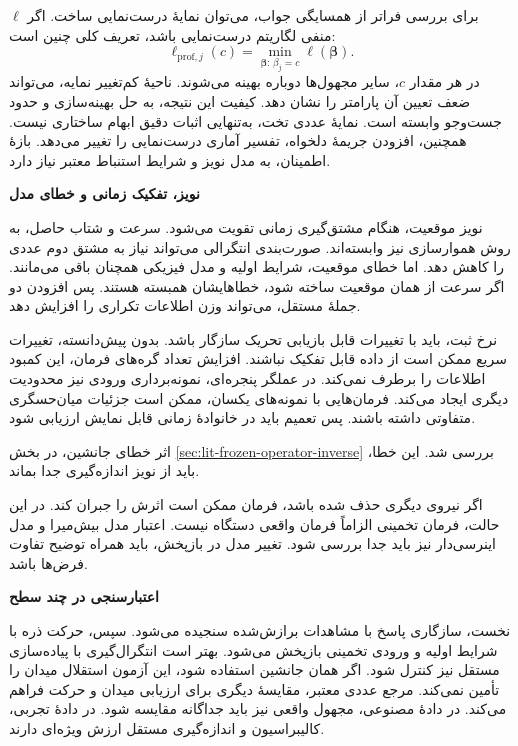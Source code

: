 برای بررسی فراتر از همسایگی جواب، می‌توان نمایهٔ درست‌نمایی ساخت.
اگر $\ell$ منفی لگاریتم درست‌نمایی باشد، تعریف کلی چنین است:
\begin{equation}
\ell_{\mathrm{prof},j}(c)
=\min_{\boldsymbol\beta:\,\beta_j=c}
\ell(\boldsymbol\beta).
\label{eq:lit-identifiability-profile}
\end{equation}
در هر مقدار $c$، سایر مجهول‌ها دوباره بهینه می‌شوند.
ناحیهٔ کم‌تغییر نمایه، می‌تواند ضعف تعیین آن پارامتر را نشان دهد.
کیفیت این نتیجه، به حل بهینه‌سازی و حدود جست‌وجو وابسته است.
نمایهٔ عددی تخت، به‌تنهایی اثبات دقیق ابهام ساختاری نیست.
همچنین، افزودن جریمهٔ دلخواه، تفسیر آماری درست‌نمایی را تغییر می‌دهد.
بازهٔ اطمینان، به مدل نویز و شرایط استنباط معتبر نیاز دارد.

\textbf{نویز، تفکیک زمانی و خطای مدل}

نویز موقعیت، هنگام مشتق‌گیری زمانی تقویت می‌شود.
سرعت و شتاب حاصل، به روش هموارسازی نیز وابسته‌اند.
صورت‌بندی انتگرالی می‌تواند نیاز به مشتق دوم عددی را کاهش دهد.
اما خطای موقعیت، شرایط اولیه و مدل فیزیکی همچنان باقی می‌مانند.
اگر سرعت از همان موقعیت ساخته شود، خطاهایشان همبسته هستند.
پس افزودن دو جملهٔ مستقل، می‌تواند وزن اطلاعات تکراری را افزایش دهد.

نرخ ثبت، باید با تغییرات قابل بازیابی تحریک سازگار باشد.
بدون پیش‌دانسته، تغییرات سریع ممکن است از داده قابل تفکیک نباشند.
افزایش تعداد گره‌های فرمان، این کمبود اطلاعات را برطرف نمی‌کند.
در عملگر پنجره‌ای، نمونه‌برداری ورودی نیز محدودیت دیگری ایجاد می‌کند.
فرمان‌هایی با نمونه‌های یکسان، ممکن است جزئیات میان‌حسگری متفاوتی داشته باشند.
پس تعمیم باید در خانوادهٔ زمانی قابل نمایش ارزیابی شود.

اثر خطای جانشین، در بخش \ref{sec:lit-frozen-operator-inverse} بررسی شد.
این خطا، باید از نویز اندازه‌گیری جدا بماند.
\cite{Cao2023ResidualCorrection}

اگر نیروی دیگری حذف شده باشد، فرمان ممکن است اثرش را جبران کند.
در این حالت، فرمان تخمینی الزاماً فرمان واقعی دستگاه نیست.
اعتبار مدل بیش‌میرا و مدل اینرسی‌دار نیز باید جدا بررسی شود.
تغییر مدل در بازپخش، باید همراه توضیح تفاوت فرض‌ها باشد.

\textbf{اعتبارسنجی در چند سطح}

نخست، سازگاری پاسخ با مشاهدات برازش‌شده سنجیده می‌شود.
سپس، حرکت ذره با شرایط اولیه و ورودی تخمینی بازپخش می‌شود.
بهتر است انتگرال‌گیری با پیاده‌سازی مستقل نیز کنترل شود.
اگر همان جانشین استفاده شود، این آزمون استقلال میدان را تأمین نمی‌کند.
مرجع عددی معتبر، مقایسهٔ دیگری برای ارزیابی میدان و حرکت فراهم می‌کند.
در دادهٔ مصنوعی، مجهول واقعی نیز باید جداگانه مقایسه شود.
در دادهٔ تجربی، کالیبراسیون و اندازه‌گیری مستقل ارزش ویژه‌ای دارند.

